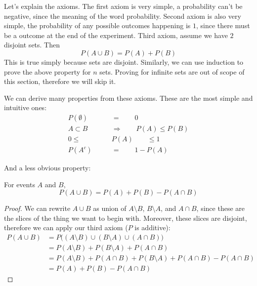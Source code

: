 \par
Let's explain the axioms. The first axiom is very simple, a probability can't be negative, since the meaning of the word probability.
Second axiom is also very simple, the probability of any possible outcomes happening is $1$, since there must be a outcome at the end of the experiment.
Third axiom, assume we have $2$ disjoint sets. Then
$$P(A \cup B)= P(A)+P(B)$$
This is true simply because sets are disjoint. Similarly, we can use induction to prove the above property for $n$ sets. Proving for infinite sets are out of scope of this section, therefore we will skip it.

\par
We can derive many properties from these axioms. These are the most simple and intuitive ones:
$$ \begin{aligned}
    P(\emptyset) \qquad &= \qquad 0 \\
    A \subset B \qquad &\Longrightarrow  \qquad P(A) \le P(B) \\
    0 \le       \qquad &P(A) \qquad \le 1 \\ 
    P(A^c)  \qquad  & = \qquad 1- P(A)
\end{aligned}$$ 

And a less obvious property: 
\begin{lemma} For  events $A$ and $B$,
    $$ P \left(A \cup B\right)= P(A)+P(B)-P(A \cap B)$$
\end{lemma}

\begin{proof}
    We can rewrite $A \cup B$ as union of $A \setminus B$, $B \setminus A$, and $A \cap B$, since these are the slices of the thing we want to begin with. Moreover, these slices are disjoint, therefore we can apply our third axiom ($P$ is additive):
$$ 
\begin{aligned} 
    P \left(A \cup B\right) &= P \bigl( (A \setminus B) \cup (B \setminus A) \cup (A \cap B) \bigr) \\
                            &= P(A \setminus B) + P( B \setminus A) + P(A \cap B)  \\
                            &= P(A \setminus B) + P( A \cap B)+ P( B \setminus A) + P(A \cap B) - P(A \cap B)  \\
                            &= P(A)+P(B)-P(A \cap B) 
\end{aligned}
$$ 
\end{proof}



